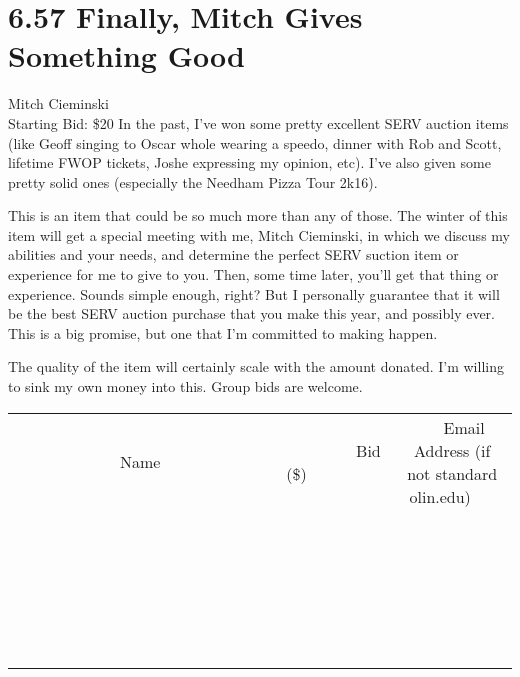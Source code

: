 \documentclass[11pt]{article}
\begin{document}
\section*{6.57 Finally, Mitch Gives Something Good}
Mitch Cieminski
\\
Starting Bid: \$20
\newline
In the past, I've won some pretty excellent SERV auction items (like Geoff singing to Oscar whole wearing a speedo, dinner with Rob and Scott, lifetime FWOP tickets, Joshe expressing my opinion, etc). I've also given some pretty solid ones (especially the Needham Pizza Tour 2k16). 

This is an item that could be so much more than any of those. The winter of this item will get a special meeting with me, Mitch Cieminski, in which we discuss my abilities and your needs, and determine the perfect SERV suction item or experience for me to give to you. Then, some time later, you'll get that thing or experience. Sounds simple enough, right? But I personally guarantee that it will be the best SERV auction purchase that you make this year, and possibly ever. This is a big promise, but one that I'm committed to making happen.

The quality of the item will certainly scale with the amount donated. I'm willing to sink my own money into this. Group bids are welcome.
\\[6ex]
\begin{tabular}{c c c}
~~~~~~~~~~~~~Name~~~~~~~~~~~~~ & ~~~~~~~~~Bid (\$)~~~~~~~~~  & ~~~Email Address (if not standard olin.edu)~~~\\
 & & \\
\hline
 & & \\
\hline
 & & \\
\hline
 & & \\
\hline
 & & \\
\hline
 & & \\
\hline
 & & \\
\hline
 & & \\
\hline
 & & \\
\hline
 & & \\
\hline
 & & \\
\hline
 & & \\
\hline
 & & \\
\hline
 & & \\
\hline
 & & \\
\hline
 & & \\
\hline
 & & \\
\hline
 & & \\
\hline
 & & \\
\hline
 & & \\
\hline
 & & \\
\hline
 & & \\
\hline
 & & \\
\hline
 & & \\
\hline
 & & \\
\hline
 & & \\
\hline
\end{tabular}
\newpage
\end{document}
